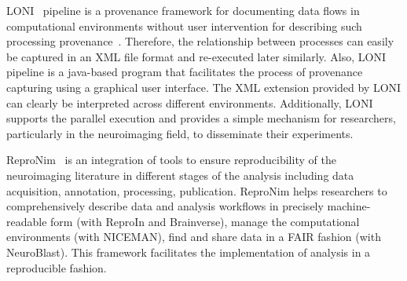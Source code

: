 LONI~\cite{rex2003loni} pipeline is a 
provenance framework for documenting data flows in computational 
environments without user intervention for describing such processing 
provenance~\cite{mackenzie2008neuroimaging}. Therefore, the 
relationship between processes can easily be captured in an XML file 
format and re-executed later similarly. 
Also, LONI pipeline is a java-based 
program that facilitates the process of provenance capturing using a 
graphical user interface. The XML extension provided by LONI can 
clearly be interpreted across different environments. Additionally,
LONI supports the parallel execution and provides a simple mechanism for researchers,
particularly in the neuroimaging field, to disseminate their experiments.

ReproNim~\cite{kennedy2019everything} is an 
integration of tools to ensure reproducibility of the neuroimaging 
literature in different stages of the analysis including data 
acquisition, annotation, processing, publication. ReproNim helps 
researchers to comprehensively describe data and analysis workflows in 
precisely machine-readable form (with ReproIn and Brainverse), manage 
the computational environments (with NICEMAN), find and share data in a 
FAIR fashion (with NeuroBlast). This framework facilitates the 
implementation of analysis in a reproducible fashion. 



